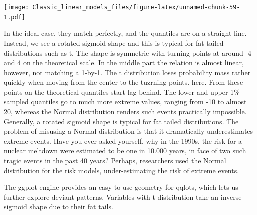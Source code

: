 \documentclass[]{svmono}
\newenvironment{Shaded}{\begin{snugshade}}{\end{snugshade}}
\newcommand{\KeywordTok}[1]{\textcolor[rgb]{0.13,0.29,0.53}{\textbf{#1}}}
\newcommand{\DataTypeTok}[1]{\textcolor[rgb]{0.13,0.29,0.53}{#1}}
\newcommand{\DecValTok}[1]{\textcolor[rgb]{0.00,0.00,0.81}{#1}}
\newcommand{\StringTok}[1]{\textcolor[rgb]{0.31,0.60,0.02}{#1}}
\newcommand{\OperatorTok}[1]{\textcolor[rgb]{0.81,0.36,0.00}{\textbf{#1}}}
\newcommand{\NormalTok}[1]{#1}
\theoremstyle{definition}
\theoremstyle{definition}
\theoremstyle{definition}
\theoremstyle{remark}
\begin{document}
\begin{Shaded}
\end{Shaded}

\texttt{[image: Classic\_linear\_models\_files/figure-latex/unnamed-chunk-59-1.pdf]}

In the ideal case, they match perfectly, and the quantiles are on a
straight line. Instead, we see a rotated sigmoid shape and this is
typical for fat-tailed distributions such as t. The shape is symmetric
with turning points at around -4 and 4 on the theoretical scale. In the
middle part the relation is almost linear, however, not matching a
1-by-1. The t distribution loses probability mass rather quickly when
moving from the center to the tuzrning points. here. From these points
on the theoretical quantiles start lag behind. The lower and upper 1\%
sampled quantiles go to much more extreme values, ranging from -10 to
almost 20, whereas the Normal distribution renders such events
practically impossible. Generally, a rotated sigmoid shape is typical
for fat tailed distributions. The problem of misusing a Normal
distribution is that it dramatically underestimates extreme events. Have
you ever asked yourself, why in the 1990s, the risk for a nuclear
meltdown were estimated to be one in 10.000 years, in face of two such
tragic events in the past 40 years? Perhaps, researchers used the Normal
distribution for the risk models, under-estimating the risk of extreme
events.

The ggplot engine provides an easy to use geometry for qqlots, which
lets us further explore deviant patterns. Variables with t distribution
take an inverse-sigmoid shape due to their fat tails.
\end{document}
